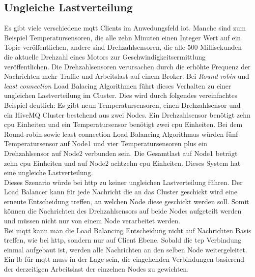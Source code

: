 \subsection{Ungleiche Lastverteilung}

Es gibt viele verschiedene \ac{mqtt} Clients im Anwedungsfeld \ac{iot}. Manche sind zum Beispiel Temperatursensoren, die alle zehn Minuten einen Integer Wert auf ein Topic veröffentlichen, andere sind Drehzahlsensoren, die alle 500 Millisekunden die aktuelle Drehzahl eines Motors zur Geschwindigkeitsermittlung veröffentlichen.
Die Drehzahlsensoren verursachen durch die erhöhte Frequenz der Nachrichten mehr Traffic und Arbeitslast auf einem Broker.
Bei \textit{Round-robin} und \textit{least connection} Load Balacing Algorithmen führt dieses Verhalten zu einer ungleichen Lastverteilung im Cluster. Dies wird durch folgendes vereinfachtes Beispiel deutlich:
Es gibt neun Temperatursensoren, einen Drehzahlsensor und ein HiveMQ Cluster bestehend aus zwei Nodes. Ein Drehzahlsensor benötigt zehn \ac{cpu} Einheiten und ein Temperatursensor benötigt zwei \ac{cpu} Einheiten. Bei dem Round-robin sowie least connection Load Balancing Algorithmus würden fünf Temperatursensor auf Node1 und vier Temperatursensoren plus ein Drehzahlsensor auf Node2 verbunden sein. Die Gesamtlast auf Node1 beträgt zehn \ac{cpu} Einheiten und auf Node2 achtzehn \ac{cpu} Einheiten. Dieses System hat eine ungleiche Lastverteilung.\\
Dieses Szenario würde bei \ac{http} zu keiner ungleichen Lastverteilung führen. Der Load Balancer kann für jede Nachricht die an das Cluster geschickt wird eine erneute Entscheidung treffen, an welchen Node diese geschickt werden soll. Somit können die Nachrichten des Drehzahlsensors auf beide Nodes aufgeteilt werden und müssen nicht nur von einem Node verarbeitet werden.\\
Bei \ac{mqtt} kann man die Load Balancing Entscheidung nicht auf Nachrichten Basis treffen, wie bei \ac{http}, sondern nur auf Client Ebene. Sobald die \ac{tcp} Verbindung einmal aufgebaut ist, werden alle Nachrichten an den selben Node weitergeleitet.\\
Ein \ac{lb} für \ac{mqtt} muss in der Lage sein, die eingehenden Verbindungen basierend der derzeitigen Arbeitslast der einzelnen Nodes zu gewichten.



